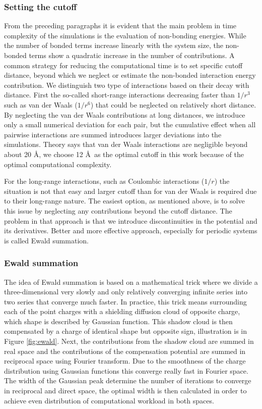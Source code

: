 \subsubsection{Setting the cutoff}
From the preceding paragraphs it is evident that the main problem in time complexity of the simulations is the evaluation of non-bonding energies. While the number of bonded terms increase linearly with the system size, the non-bonded terms show a quadratic increase in the number of contributions. A common strategy for reducing the computational time is to set specific cutoff distance, beyond which we neglect or estimate the non-bonded interaction energy contribution. We distinguish two type of interactions based on their decay with distance. First the so-called short-range interactions decreasing faster than $1/r^3$ such as van der Waals ($1/r^6$) that could be neglected on relatively short distance. By neglecting the van der Waals contributions at long distances, we introduce only a small numerical deviation for each pair, but the cumulative effect when all pairwise interactions are summed introduces larger deviations into the simulations. Theory says that van der Waals interactions are negligible beyond about 20 \AA, we choose 12 \AA~as the optimal cutoff in this work because of the optimal computational complexity. \cite{mdskripta}

For the long-range interactions, such as Coulombic interactions ($1/r$) the situation is not that easy and larger cutoff than for van der Waals is required due to their long-range nature. The easiest option, as mentioned above, is to solve this issue by neglecting any contributions beyond the cutoff distance. The problem in that approach is that we introduce discontinuities in the potential and its derivatives. Better and more effective approach, especially for periodic systems is called Ewald summation.


\subsubsection{Ewald summation}
The idea of Ewald summation is based on a mathematical trick where we divide a three-dimensional very slowly and only relatively converging infinite series into two series that converge much faster. In practice, this trick means surrounding each of the point charges with a shielding diffusion cloud of opposite charge, which shape is described by Gaussian function. This shadow cloud is then compensated by a charge of identical shape but opposite sign, illustration is in Figure \ref{fig:ewald}. Next, the contributions from the shadow cloud are summed in real space and the contributions of the compensation potential are summed in reciprocal space using Fourier transform. Due to the smoothness of the charge distribution using Gaussian functions this converge really fast in Fourier space. The width of the Gaussian peak determine the number of iterations to converge in reciprocal and direct space, the optimal width is then calculated in order to achieve even distribution of computational workload in both spaces. \cite{Sritterova}


